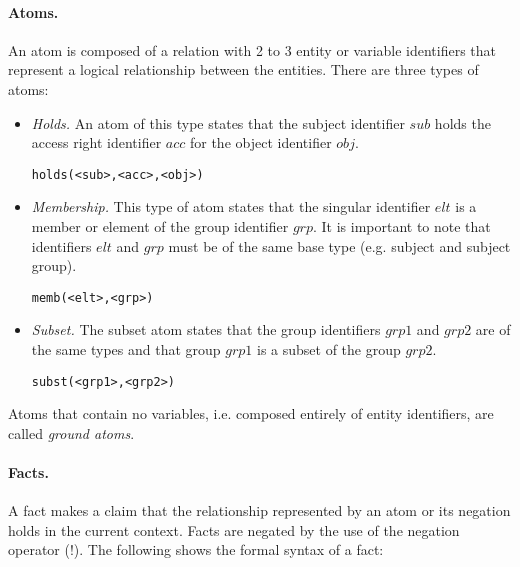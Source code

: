 \documentclass[11pt, twocolumn]{article}
\newenvironment{vverbatim}
  {\begin{alltt}}
  {\vspace{-\baselineskip}\end{alltt}}
\begin{document}
        \paragraph{Atoms.}
          An atom is composed of a relation with 2 to 3 entity or variable
          identifiers that represent a logical relationship between the
          entities. There are three types of atoms:

          \begin{itemize}
            \item
              {\em Holds.} An atom of this type states that the subject
              identifier $sub$ holds the access right identifier $acc$
              for the object identifier $obj$.

              \begin{vverbatim}
  holds(<sub>, <acc>, <obj>)
              \end{vverbatim}
            \item
              {\em Membership.} This type of atom states that the singular
              identifier $elt$ is a member or element of the group identifier
              $grp$. It is important to note that identifiers $elt$ and $grp$
              must be of the same base type (e.g. subject and subject group).

              \begin{vverbatim}
  memb(<elt>, <grp>)
              \end{vverbatim}
            \item
              {\em Subset.} The subset atom states that the group identifiers
              $grp1$ and $grp2$ are of the same types and that group $grp1$ is
              a subset of the group $grp2$.

              \begin{vverbatim}
  subst(<grp1>, <grp2>)
              \end{vverbatim}
          \end{itemize}

          Atoms that contain no variables, i.e. composed entirely of entity
          identifiers, are called {\em ground atoms}.

        \paragraph{Facts.}
          A fact makes a claim that the relationship represented by an atom or
          its negation holds in the current context. Facts are negated by the
          use of the negation operator ($!$). The following shows the formal
          syntax of a fact:
\end{document}
